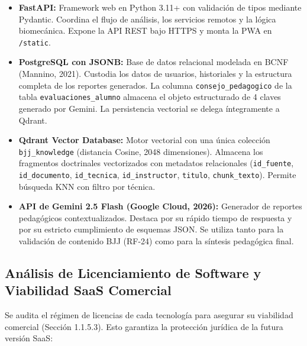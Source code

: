 \documentclass[12pt,letterpaper]{article}
\begin{document}
\begin{itemize}
    \item \textbf{FastAPI:} Framework web en Python 3.11+ con validación de tipos mediante Pydantic. Coordina el flujo de análisis, los servicios remotos y la lógica biomecánica. Expone la API REST bajo HTTPS y monta la PWA en \texttt{/\allowbreak static}.
    \item \textbf{PostgreSQL con JSONB:} Base de datos relacional modelada en BCNF (Mannino, 2021). Custodia los datos de usuarios, historiales y la estructura completa de los reportes generados. La columna \texttt{consejo\_\allowbreak pedagogico} de la tabla \texttt{evaluaciones\_\allowbreak alumno} almacena el objeto estructurado de 4 claves generado por Gemini. La persistencia vectorial se delega íntegramente a Qdrant.
    \item \textbf{Qdrant Vector Database:} Motor vectorial con una única colección \texttt{bjj\_\allowbreak knowledge} (distancia Cosine, 2048 dimensiones). Almacena los fragmentos doctrinales vectorizados con metadatos relacionales (\texttt{id\_\allowbreak fuente}, \texttt{id\_\allowbreak documento}, \texttt{id\_\allowbreak tecnica}, \texttt{id\_\allowbreak instructor}, \texttt{titulo}, \texttt{chunk\_\allowbreak texto}). Permite búsqueda KNN con filtro por técnica.
    \item \textbf{API de Gemini 2.5 Flash (Google Cloud, 2026):} Generador de reportes pedagógicos contextualizados. Destaca por su rápido tiempo de respuesta y por su estricto cumplimiento de esquemas JSON. Se utiliza tanto para la validación de contenido BJJ (RF-24) como para la síntesis pedagógica final.
\end{itemize}

\subsection{Análisis de Licenciamiento de Software y Viabilidad SaaS Comercial}

Se audita el régimen de licencias de cada tecnología para asegurar su viabilidad comercial (Sección 1.1.5.3). Esto garantiza la protección jurídica de la futura versión SaaS:
\end{document}
